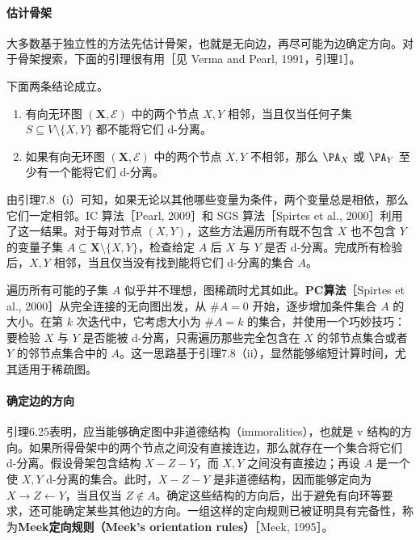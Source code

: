 \paragraph{估计骨架}
大多数基于独立性的方法先估计骨架，也就是无向边，再尽可能为边确定方向。对于骨架搜索，下面的引理很有用［见 Verma and Pearl, 1991，引理1］。

\begin{lemma}
下面两条结论成立。
\begin{enumerate}[label=(\roman*)]
 \item 有向无环图 $(\mathbf X,\mathcal E)$ 中的两个节点 $X,Y$ 相邻，当且仅当任何子集 $S\subseteq V\setminus\{X,Y\}$ 都不能将它们 d-分离。
 \item 如果有向无环图 $(\mathbf X,\mathcal E)$ 中的两个节点 $X,Y$ 不相邻，那么 $\PA_X$ 或 $\PA_Y$ 至少有一个能将它们 d-分离。
\end{enumerate}
\end{lemma}

由引理7.8（i）可知，如果无论以其他哪些变量为条件，两个变量总是相依，那么它们一定相邻。IC 算法［Pearl, 2009］和 SGS 算法［Spirtes et al., 2000］利用了这一结果。对于每对节点 $(X,Y)$，这些方法遍历所有既不包含 $X$ 也不包含 $Y$ 的变量子集 $A\subseteq\mathbf X\setminus\{X,Y\}$，检查给定 $A$ 后 $X$ 与 $Y$ 是否 d-分离。完成所有检验后，$X,Y$ 相邻，当且仅当没有找到能将它们 d-分离的集合 $A$。

遍历所有可能的子集 $A$ 似乎并不理想，图稀疏时尤其如此。\textbf{PC算法}［Spirtes et al., 2000］从完全连接的无向图出发，从 $\#A=0$ 开始，逐步增加条件集合 $A$ 的大小。在第 $k$ 次迭代中，它考虑大小为 $\#A=k$ 的集合，并使用一个巧妙技巧：要检验 $X$ 与 $Y$ 是否能被 d-分离，只需遍历那些完全包含在 $X$ 的邻节点集合或者 $Y$ 的邻节点集合中的 $A$。这一思路基于引理7.8（ii），显然能够缩短计算时间，尤其适用于稀疏图。

\paragraph{确定边的方向}
引理6.25表明，应当能够确定图中非道德结构（immoralities），也就是 v 结构的方向。如果所得骨架中的两个节点之间没有直接连边，那么就存在一个集合将它们 d-分离。假设骨架包含结构 $X-Z-Y$，而 $X,Y$ 之间没有直接边；再设 $A$ 是一个使 $X,Y$ d-分离的集合。此时，$X-Z-Y$ 是非道德结构，因而能够定向为 $X\to Z\leftarrow Y$，当且仅当 $Z\notin A$。确定这些结构的方向后，出于避免有向环等要求，还可能确定某些其他边的方向。一组这样的定向规则已被证明具有完备性，称为\textbf{Meek定向规则（Meek's orientation rules）}［Meek, 1995］。


